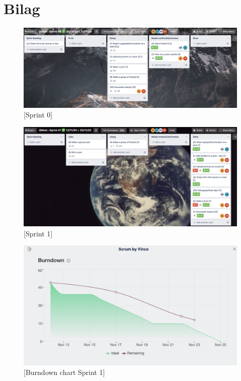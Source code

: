 \chapter{Bilag}\label{ch:bilag}

\begin{figure}
    \includegraphics[width=\linewidth]{figures/Sprint 0.png}
    \caption{[Sprint 0]}
    \label{fig:[Sp0]}
\end{figure}


\begin{figure}
    \includegraphics[width=\linewidth]{figures/Sprint 1.png}
    \caption{[Sprint 1]}
    \label{fig:[Sp1]}
\end{figure}


\begin{figure}
    \includegraphics[width=\linewidth]{figures/Sprint 1 Burndown.png}
    \caption{[Burndown chart Sprint 1]}
    \label{fig:[Bc1]}
\end{figure}



